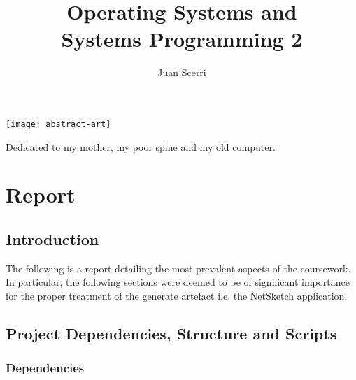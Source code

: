 \documentclass[article]{uom-coursework}
\title{Operating Systems and \\ Systems Programming 2}
\author{Juan Scerri}
\makeatletter
\newcommand{\RemoveAlgoNumber}{\renewcommand{\fnum@algocf}{\AlCapSty{\AlCapFnt\algorithmcfname}}}
\makeatother
\begin{document}
\RemoveAlgoNumber


\pagestyle{umpage}

\frontmatter

\maketitle %

\clearpage

\thispagestyle{empty}
\vspace*{9em}
\begin{center}
\texttt{[image: abstract-art]}
\end{center}

\vspace*{2em}
\begin{center}
    Dedicated to my mother, my poor spine and my old computer.
\end{center}

\clearpage

\tableofcontents %

\clearpage

\lstlistoflistings

\clearpage

\mainmatter

\chapter*{Report}
\label{chap:report}

\section{Introduction}

The following is a report detailing the most prevalent
aspects of the coursework. In particular, the following
sections were deemed to be of significant importance for
the proper treatment of the generate artefact i.e. the
NetSketch application.

\section{Project Dependencies, Structure and Scripts}

\subsection{Dependencies}
\end{document}
